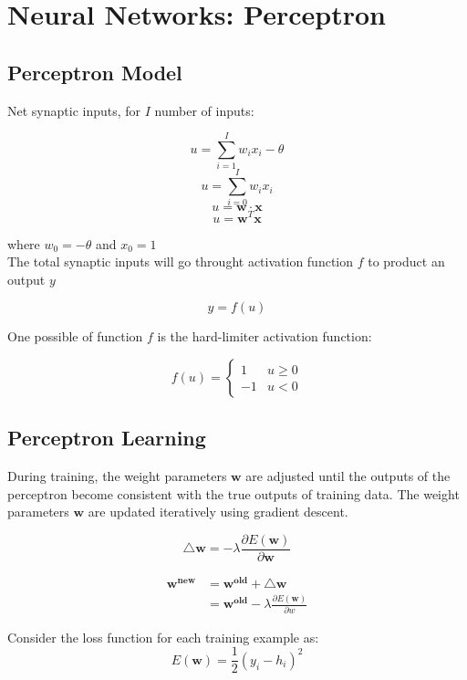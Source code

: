 \chapter{Neural Networks: Perceptron}
\begin{multicols*}{2}

\section{Perceptron Model}

\noindent Net synaptic inputs, for $I$ number of inputs:

$$u = \sum_{i=1}^I w_i x_i - \theta$$
$$u = \sum_{i=0}^I w_i x_i$$
$$u = \mathbf{w} \cdot \mathbf{x}$$
$$u = \mathbf{w}^T \mathbf{x}$$

\noindent where $w_0=-\theta$ and $x_0=1$ \\

\noindent The total synaptic inputs will go throught activation function $f$ to product an output $y$ 

$$y=f(u)$$

\noindent One possible of function $f$ is the hard-limiter activation function:

$$
f(u) = 
\begin{cases}
1 & u \ge 0\\
-1 & u < 0
\end{cases}
$$

\section{Perceptron Learning}

During training, the weight parameters $\mathbf{w}$ are adjusted until the outputs of the perceptron become consistent with the true outputs of training data. The weight parameters $\mathbf{w}$ are updated iteratively using gradient descent. 

$$\mathbf{\triangle w} = - \lambda \frac{\partial E(\mathbf{w})}{\partial \mathbf{w}}$$

\begin{equation*}
\begin{split}
\mathbf{w^{new}} &= \mathbf{w^{old} + \triangle w } \\
&= \mathbf{w^{old}} - \lambda \frac{\partial E(\mathbf{w})}{\partial w}
\end{split}
\end{equation*}

\noindent Consider the loss function for each training example as:
$$E(\mathbf{w})=\frac{1}{2}(y_i-h_i)^{2}$$


\end{multicols*}
